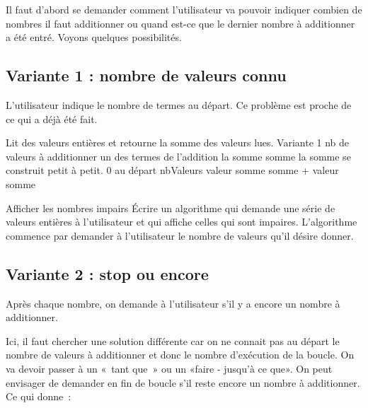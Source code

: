 	Il faut d’abord se demander 
	comment l’utilisateur va pouvoir indiquer
	combien de nombres il faut additionner 
	ou quand est-ce que le dernier nombre à additionner a été entré. 
	Voyons quelques possibilités.
	
	\subsection{Variante 1 : nombre de valeurs connu} 
	
		L’utilisateur indique le nombre de termes au départ.
		Ce problème est proche de ce qui a déjà été fait.
		
		\begin{LDA}
		\LComment Lit des valeurs entières et retourne la somme des valeurs lues.
		 \RComment Variante 1
			 \RComment nb de valeurs à additionner
			 \RComment un des termes de l’addition
			 \RComment la somme
			\Let somme  \RComment la somme se construit petit à petit. 0 au départ
			\Read nbValeurs
				\Read valeur
				\Let somme \Gets somme + valeur 
			\EndFor
			\Return somme
		\EndAlgo
		\end{LDA}

		\begin{Exercice}{Afficher les nombres impairs}
			Écrire un algorithme qui demande une série
			de valeurs entières à l'utilisateur
			et qui affiche celles qui sont impaires.
			L'algorithme commence par demander à l'utilisateur
			le nombre de valeurs qu'il désire donner.
		\end{Exercice}
			
	\subsection{Variante 2 : stop ou encore}
	
		Après chaque nombre, 
		on demande à l’utilisateur s’il y a encore un nombre à additionner.

		Ici, il faut chercher une solution différente
		car on ne connait pas au départ le nombre de valeurs à additionner et
		donc le nombre d’exécution de la boucle. On va devoir passer à un
		«~tant que~» ou un «faire - jusqu’à ce que». On peut
		envisager de demander en fin de boucle s’il reste
		encore un nombre à additionner. Ce qui donne~:

